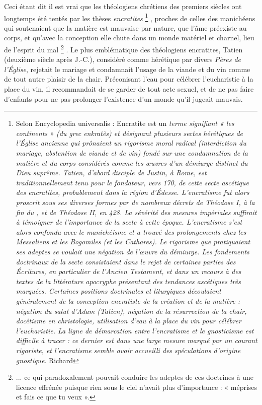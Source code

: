  Ceci étant dit il est vrai que les théologiens chrétiens des premiers siècles ont longtemps été tentés par les thèses \emph{encratites}%
\footnote{Selon Encyclopedia universalis : Encratite est un \emph{terme signifiant « les continents » (du grec \emph{enkratès}) et désignant plusieurs sectes hérétiques de l'Église ancienne qui prônaient un rigorisme moral radical (interdiction du mariage, abstention de viande et de vin) fondé sur une condamnation de la matière et du corps considérés comme les œuvres d'un démiurge distinct du Dieu suprême. Tatien, d'abord disciple de Justin, à Rome, est traditionnellement tenu pour le fondateur, vers 170, de cette secte ascétique des encratites, probablement dans la région d'Édesse. L'encratisme fut alors proscrit sous ses diverses formes par de nombreux décrets de Théodose I\ier, à la fin du , et de Théodose II, en 428.
La sévérité des mesures impériales suffirait à témoigner de l'importance de la secte à cette époque. L'encratisme s'est alors confondu avec le manichéisme et a trouvé des prolongements chez les Messaliens et les Bogomiles (et les Cathares). Le rigorisme que pratiquaient ses adeptes se voulait une négation de l'œuvre du démiurge. Les fondements doctrinaux de la secte consistaient dans le rejet de certaines parties des Écritures, en particulier de l'Ancien Testament, et dans un recours à des textes de la littérature apocryphe présentant des tendances ascétiques très marquées. Certaines positions doctrinales et liturgiques découlaient généralement de la conception encratiste de la création et de la matière : négation du salut d'Adam (Tatien), négation de la résurrection de la chair, docétisme en christologie, utilisation d'eau à la place du vin pour célébrer l'eucharistie. La ligne de démarcation entre l'encratisme et le gnosticisme est difficile à tracer : ce dernier est dans une large mesure marqué par un courant rigoriste, et l'encratisme semble avoir accueilli des spéculations d'origine gnostique}.
Richard }%
, proches de celles des manichéens qui soutenaient que la matière est mauvaise par nature, que l'âme préexiste au corps, et qu'avec la conception elle chute dans un monde matériel et charnel, lieu de l'esprit du mal%
\footnote{... ce qui paradoxalement pouvait conduire les adeptes de ces doctrines à une licence effrénée puisque rien sous le ciel n'avait plus d'importance : « méprises et fais ce que tu veux ».}%
. Le plus emblématique des théologiens encratites, Tatien (deuxième siècle après J.-C.), considéré comme hérétique par divers \emph{Pères de l'Église}, rejetait le mariage et condamnait l'usage de la viande et du vin comme de tout autre plaisir de la chair. Préconisant l'eau pour célébrer l'eucharistie à la place du vin, il recommandait de se garder de tout acte sexuel, et de ne pas faire d'enfants pour ne pas prolonger l'existence d'un monde qu'il jugeait mauvais. 

